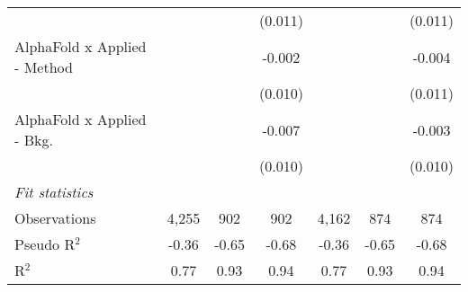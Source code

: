 \begin{tabular}{lcccccc}
                                &               &             & (0.011)        &               &         & (0.011)\\   
   AlphaFold x Applied - Method &               &             & -0.002         &               &         & -0.004\\   
                                &               &             & (0.010)        &               &         & (0.011)\\   
   AlphaFold x Applied - Bkg.   &               &             & -0.007         &               &         & -0.003\\   
                                &               &             & (0.010)        &               &         & (0.010)\\   
   \midrule
   \emph{Fit statistics}\\
   Observations                 & 4,255         & 902         & 902            & 4,162         & 874     & 874\\  
   Pseudo R$^2$                 & -0.36         & -0.65       & -0.68          & -0.36         & -0.65   & -0.68\\  
   R$^2$                        & 0.77          & 0.93        & 0.94           & 0.77          & 0.93    & 0.94\\  
   

\end{tabular}
